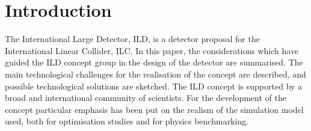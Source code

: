 \documentclass[%
 amsmath,amssymb,
 aps,
 longbibliography,
]{revtex4-1}
\begin{document}



\date{\today}%






\maketitle



\section{\label{sec:level1}Introduction}
The International Large Detector, ILD, is a detector proposal for the International Linear Collider, ILC. In this paper, the considerations which have guided the ILD concept group in the design of the detector are summarised. The main technological challenges for the realisation of the concept are described, and possible technological solutions are sketched. The ILD concept is supported by a broad and international community of scientists. For the development of the concept particular emphasis has been put on the realism of the simulation model used, both for optimisation studies and for physics benchmarking.
\end{document}
